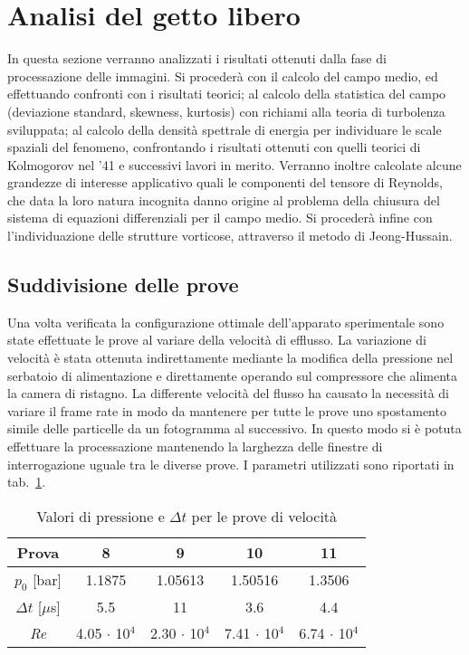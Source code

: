 \documentclass{article} %
\begin{document}
\section{Analisi del getto libero} 
In questa sezione verranno analizzati i risultati ottenuti dalla fase di processazione delle immagini. Si procederà con il calcolo del campo medio, ed effettuando confronti con i risultati teorici; al calcolo della statistica del campo (deviazione standard, skewness, kurtosis) con richiami alla teoria di turbolenza sviluppata; al calcolo della densità spettrale di energia per individuare le scale spaziali del fenomeno, confrontando i risultati ottenuti con quelli teorici di Kolmogorov nel '41 e successivi lavori in merito. Verranno inoltre calcolate alcune grandezze di interesse applicativo quali le componenti del tensore di Reynolds, che data la loro natura incognita danno origine al problema della chiusura del sistema di equazioni differenziali per il campo medio. Si procederà infine con l'individuazione delle strutture vorticose, attraverso il metodo di Jeong-Hussain.
\subsection{Suddivisione delle prove}
Una volta verificata la configurazione ottimale dell'apparato sperimentale sono state effettuate le prove al variare della velocità di efflusso. La variazione di velocità è stata ottenuta indirettamente mediante la modifica della pressione nel serbatoio di alimentazione e direttamente operando sul compressore che alimenta la camera di ristagno. La differente velocità del flusso ha causato la necessità di variare il frame rate in modo da mantenere per tutte le prove uno spostamento simile delle particelle da un fotogramma al successivo. In questo modo si è potuta effettuare la processazione mantenendo la larghezza delle finestre di interrogazione uguale tra le diverse prove. I parametri utilizzati sono riportati in tab.~\ref{tab:prove_811}.
\begin{table}[h!]
	\centering
	\begin{tabular}{@{}ccccc@{}}
		\toprule
		Prova & 8 & 9 & 10 & 11 \\ \midrule
		$p_0$ [bar] & 1.1875 & 1.05613 & 1.50516 & 1.3506 \\ \midrule
		$\Delta t$ [$\mu$s] & 5.5 & 11 & 3.6 & 4.4 \\ \midrule
		\textit{Re} & 4.05 $\cdot$ 10$^4$ & 2.30 $\cdot$ 10$^4$ & 7.41 $\cdot$ 10$^4$ & 6.74 $\cdot$ 10$^4$ \\ \bottomrule
	\end{tabular}
	\caption{Valori di pressione e $\Delta t$ per le prove di velocità}
	\label{tab:prove_811}
\end{table}
\clearpage
\end{document}
